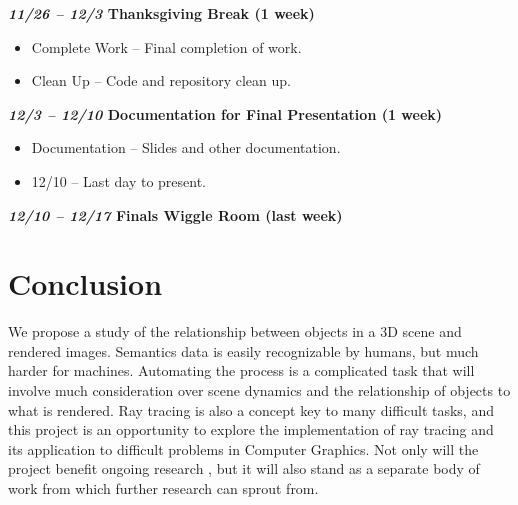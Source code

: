 \documentclass[conference]{IEEEtran}
\begin{document}
\textbf{\textit{11/26 -- 12/3} Thanksgiving Break (1 week)}
\begin{itemize}
\item Complete Work -- Final completion of work.
\item Clean Up -- Code and repository clean up.
\end{itemize}
\textbf{\textit{12/3 -- 12/10} Documentation for Final Presentation (1 week)}
\begin{itemize}
\item Documentation -- Slides and other documentation.
\item 12/10 -- Last day to present.
\end{itemize}
\textbf{\textit{12/10 -- 12/17} Finals Wiggle Room (last week)}

\section{Conclusion}
\label{sec:conclusion}
We propose a study of the relationship between objects in a 3D scene and rendered images.
Semantics data is easily recognizable by humans, but much harder for machines.
Automating the process is a complicated task that will involve much consideration over
scene dynamics and the relationship of objects to what is rendered.
Ray tracing is also a concept
key to many difficult tasks, and this project is an
opportunity to explore the implementation of ray tracing and its application
to difficult problems in Computer Graphics.
Not only will the project benefit ongoing research \cite{thesis_harris},
but it will also stand as a separate body of work from which further research can sprout from.




\end{document}
